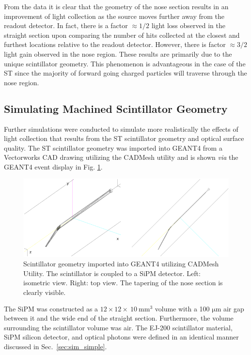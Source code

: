 From the data it is clear that the geometry of the nose section results in an improvement of light collection as the source moves further away from the readout detector.  In fact, there is a factor $\approx 1/2$ light loss observed in the straight section upon comparing the number of hits collected at the closest and furthest locations relative to the readout detector.  However, there is factor $\approx 3/2$ light gain observed in the nose region.  These results are primarily due to the unique scintillator geometry.  This phenomenon is advantageous in the case of the ST since the majority of forward going charged particles will traverse through the nose region.

\subsection{Simulating Machined Scintillator Geometry} \label{sec:sim_mach}

Further simulations were conducted to simulate more realistically the effects of light collection that results from the ST scintillator geometry and optical surface quality.  The ST scintillator geometry was imported into GEANT4 from a Vectorworks CAD drawing utilizing the CADMesh utility \cite{cadmesh_g4} and is shown \textit{via} the GEANT4 event display in Fig. \ref{fig:pk_cadmesh}.
	\begin{figure}[!htb]
	\centering
	\includegraphics[width=1.0\columnwidth]{simulation/figs/pk_cadmesh}
	\caption{Scintillator geometry imported into GEANT4 utilizing CADMesh Utility.  The scintillator is  coupled to a SiPM detector.  Left: isometric view.  Right: top view.  The tapering of the nose section is clearly visible.}
	\label{fig:pk_cadmesh}
	\end{figure}
The SiPM was constructed as a $12 \times 12 \times\ 10\ \mathrm{mm^{3}}$ volume with a 100 $\mathrm{\mu m}$ air gap between it and the wide end of the straight section.  Furthermore, the volume surrounding the scintillator volume was air.  The EJ-200 scintillator material, SiPM silicon detector, and optical photons were defined in an identical manner discussed in Sec.~\ref{sec:sim_simple}.

